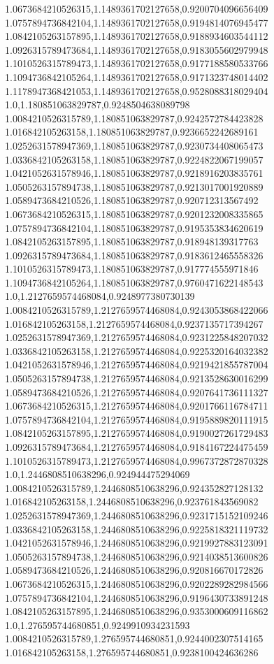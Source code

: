 1.0673684210526315,1.1489361702127658,0.9200704096656409
1.0757894736842104,1.1489361702127658,0.9194814076945477
1.0842105263157895,1.1489361702127658,0.9188934603544112
1.0926315789473684,1.1489361702127658,0.9183055602979948
1.1010526315789473,1.1489361702127658,0.9177188580533766
1.1094736842105264,1.1489361702127658,0.9171323748014402
1.1178947368421053,1.1489361702127658,0.9528088318029404
1.0,1.180851063829787,0.9248504638089798
1.0084210526315789,1.180851063829787,0.9242572784423828
1.016842105263158,1.180851063829787,0.9236652242689161
1.0252631578947369,1.180851063829787,0.9230734408065473
1.0336842105263158,1.180851063829787,0.9224822067199057
1.0421052631578946,1.180851063829787,0.9218916203835761
1.0505263157894738,1.180851063829787,0.9213017001920889
1.0589473684210526,1.180851063829787,0.920712313567492
1.0673684210526315,1.180851063829787,0.9201232008335865
1.0757894736842104,1.180851063829787,0.9195353834620619
1.0842105263157895,1.180851063829787,0.918948139317763
1.0926315789473684,1.180851063829787,0.9183612465558326
1.1010526315789473,1.180851063829787,0.917774555971846
1.1094736842105264,1.180851063829787,0.9760471622148543
1.0,1.2127659574468084,0.9248977380730139
1.0084210526315789,1.2127659574468084,0.9243053868422066
1.016842105263158,1.2127659574468084,0.9237135717394267
1.0252631578947369,1.2127659574468084,0.9231225848207032
1.0336842105263158,1.2127659574468084,0.9225320164032382
1.0421052631578946,1.2127659574468084,0.9219421855787004
1.0505263157894738,1.2127659574468084,0.9213528630016299
1.0589473684210526,1.2127659574468084,0.9207641736111327
1.0673684210526315,1.2127659574468084,0.9201766116784711
1.0757894736842104,1.2127659574468084,0.9195889820111915
1.0842105263157895,1.2127659574468084,0.9190027261729483
1.0926315789473684,1.2127659574468084,0.9184167224475459
1.1010526315789473,1.2127659574468084,0.9967372872870328
1.0,1.2446808510638296,0.924944475294069
1.0084210526315789,1.2446808510638296,0.924352827128132
1.016842105263158,1.2446808510638296,0.923761843569082
1.0252631578947369,1.2446808510638296,0.9231715152109246
1.0336842105263158,1.2446808510638296,0.9225818321119732
1.0421052631578946,1.2446808510638296,0.9219927883123091
1.0505263157894738,1.2446808510638296,0.9214038513600826
1.0589473684210526,1.2446808510638296,0.920816670172826
1.0673684210526315,1.2446808510638296,0.9202289282984566
1.0757894736842104,1.2446808510638296,0.9196430733891248
1.0842105263157895,1.2446808510638296,0.9353000609116862
1.0,1.276595744680851,0.9249910934231593
1.0084210526315789,1.276595744680851,0.9244002307514165
1.016842105263158,1.276595744680851,0.9238100424636286
